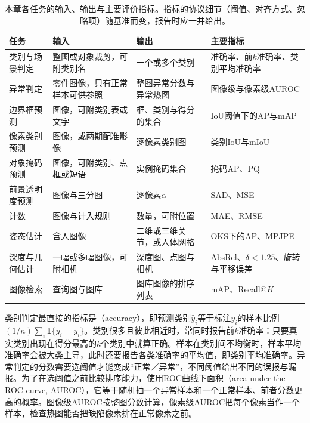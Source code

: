 \begin{table}[tbp]
 \centering
 \small
 \begin{tabularx}{\linewidth}{@{}lXXX@{}}
 \toprule
 任务 & 输入 & 输出 & 主要指标\\
 \midrule
 类别与场景判定 & 整图或对象裁剪，可附类别名 & 一个或多个类别 & 准确率、前$k$准确率、类别平均准确率\\
 异常判定 & 零件图像，只有正常样本可供参照 & 整图异常分数与异常热图 & 图像级与像素级AUROC\\
 边界框预测 & 图像，可附类别表或文字 & 框、类别与得分的集合 & IoU阈值下的AP与mAP\\
 像素类别预测 & 图像，或两期配准影像 & 逐像素类别图 & 类别IoU与mIoU\\
 对象掩码预测 & 图像，可附类别、点框或短语 & 实例掩码集合 & 掩码AP、PQ\\
 前景透明度预测 & 图像与三分图 & 逐像素$\alpha$ & SAD、MSE\\
 计数 & 图像与计入规则 & 数量，可附位置 & MAE、RMSE\\
 姿态估计 & 含人图像 & 二维或三维关节，或人体网格 & OKS下的AP、MPJPE\\
 深度与几何估计 & 一幅或多幅图像，可附相机 & 深度图、点图与相机 & AbsRel、$\delta<1.25$、旋转与平移误差\\
 图像检索 & 查询图与图库 & 图库图像的排序列表 & mAP、Recall@$K$\\
 \bottomrule
 \end{tabularx}
 \caption{本章各任务的输入、输出与主要评价指标。指标的协议细节（阈值、对齐方式、忽略项）随基准而变，报告时应一并给出。}
 \label{tab:vision-recognition-task-metrics}
\end{table}

类别判定最直接的指标是（accuracy），即预测类别$\hat y_i$等于标注$y_i$的样本比例$(1/n)\sum_i\mathbf 1\{\hat y_i=y_i\}$。类别很多且彼此相近时，常同时报告前$k$准确率：只要真实类别出现在得分最高的$k$个类别中就算正确。样本在类别间不均衡时，样本平均准确率会被大类主导，此时还要报告各类准确率的平均值，即类别平均准确率。异常判定的分数需要选阈值才能变成“正常／异常”，不同阈值给出不同的误报与漏报。为了在选阈值之前比较排序能力，使用ROC曲线下面积（area under the ROC curve, AUROC），它等于随机抽一个异常样本和一个正常样本、前者分数更高的概率。图像级AUROC按整图分数计算，像素级AUROC把每个像素当作一个样本，检查热图能否把缺陷像素排在正常像素之前。

